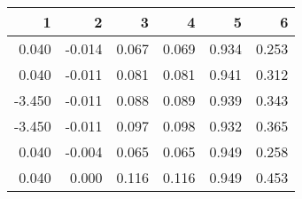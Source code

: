 \begin{table}[ht]
\centering
\begin{tabular}{rrrrrr}
  \hline
1 & 2 & 3 & 4 & 5 & 6 \\ 
  \hline
0.040 & -0.014 & 0.067 & 0.069 & 0.934 & 0.253 \\ 
  0.040 & -0.011 & 0.081 & 0.081 & 0.941 & 0.312 \\ 
  -3.450 & -0.011 & 0.088 & 0.089 & 0.939 & 0.343 \\ 
  -3.450 & -0.011 & 0.097 & 0.098 & 0.932 & 0.365 \\ 
  0.040 & -0.004 & 0.065 & 0.065 & 0.949 & 0.258 \\ 
  0.040 & 0.000 & 0.116 & 0.116 & 0.949 & 0.453 \\ 
   \hline
\end{tabular}
\end{table}
